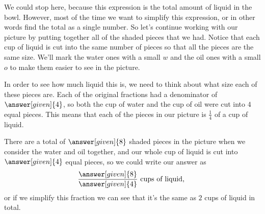 \documentclass{ximera}
\begin{document}
\begin{question}
\begin{explanation}
We could stop here, because this expression is the total amount of liquid in the bowl. However, most of the time we want to simplify this expression, or in other words find the total as a single number. So let's continue working with our picture by putting together all of the shaded pieces that we had. Notice that each cup of liquid is cut into the same number of pieces so that all the pieces are the same size. We'll mark the water ones with a small $w$ and the oil ones with a small $o$ to make them easier to see in the picture.

\begin{image}
\end{image}
In order to see how much liquid this is, we need to think about what size each of these pieces are. Each of the original fractions had a denominator of $\answer[given]{4}$, so both the cup of water and the cup of oil were cut into $4$ equal pieces. This means that each of the pieces in our picture is $\frac{1}{4}$ of a cup of liquid. 

\begin{image}
\end{image}

There are a total of $\answer[given]{8}$ shaded pieces in the picture when we consider the water and oil together, and our whole cup of liquid is cut into $\answer[given]{4}$ equal pieces, so we could write our answer as 
\[
\frac{\answer[given]{8}}{\answer[given]{4}} \textrm{ cups of liquid, }
\]
or if we simplify this fraction we can see that it's the same as $2$ cups of liquid in total.

\end{explanation}
\end{question}
\end{document}
